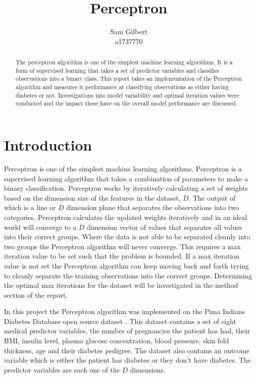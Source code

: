 \documentclass[10pt,twocolumn,letterpaper]{article}
\begin{document}
\title{Perceptron}

\author{Sam Gilbert\\
   a1737770\\}
\maketitle

\begin{abstract}
   The perceptron algorithm is one of the simplest machine learning algorithms. It is a
   form of supervised learning that takes a set of predictor variables and classifies observations
   into a binary class. This report takes an implementation of the Perceptron algorithm and measures
   it performance at classifying observations as either having diabetes or not. Investigations into
   model variability and optimal iteration values were conducted and the impact these have on the
   overall model performance are discussed.
\end{abstract}

\section{Introduction}

Perceptron is one of the simplest machine learning algorithms. Perceptron is a supervised learning
algorithm that takes a combination of parameters to make a binary classification.
Perceptron works by iteratively calculating a set of weights based on the dimension size
of the features in the dataset, $D$. The output of which is a line or $D$ dimension plane
that separates the observations into two categories. Perceptron calculates the updated
weights iteratively and in an ideal world will converge to a $D$ dimension vector of values
that separates all values into their correct groups. Where the data is not able to be
separated cleanly into two groups the Perceptron algorithm will never converge. This requires
a max iteration value to be set such that the problem is bounded. If a max iteration value
is not set the Perceptron algorithm can keep moving back and forth trying to cleanly separate
the training observations into the correct groups. Determining the optimal max iterations
for the dataset will be investigated in the method section of the report.

In this project the Perceptron algorithm was implemented on the Pima Indians Diabetes Database
open source dataset \cite{kagglePimaIndians}. This dataset contains a set of eight medical
predictor variables, the number of pregnancies the patient has had, their BMI, insulin level,
plasma glucose concentration, blood pressure, skin fold thickness, age and their diabetes
pedigree. The dataset also contains an outcome variable which is either the patient has
diabetes or they don't have diabetes. The predictor variables are each one of the $D$
dimensions.
\end{document}
